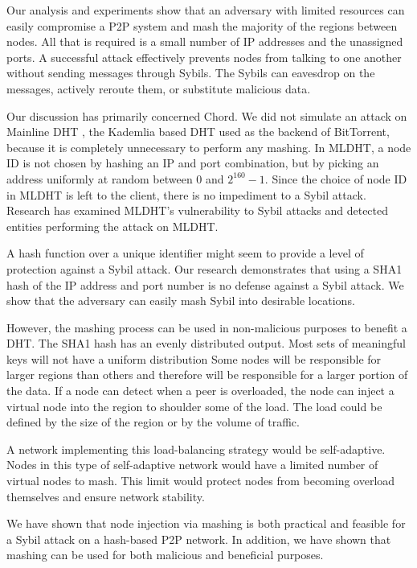 \documentclass[11pt,conference]{IEEEtran}
\begin{document}
Our analysis and experiments show that an adversary with limited resources can easily compromise a P2P system and mash the majority of the regions between nodes.
All that is required is a small number of IP addresses and the unassigned ports.
A successful attack effectively prevents nodes from talking to one another without sending messages through Sybils.
The Sybils can eavesdrop on the messages, actively reroute them, or substitute malicious data.

Our discussion has primarily concerned Chord.
We did not simulate an attack on Mainline DHT  \cite{mainline}, the Kademlia \cite{kademlia} based DHT used as the backend of BitTorrent, because it is completely unnecessary to perform any mashing.
In MLDHT, a node ID is not chosen by hashing an IP and port combination, but by picking an address uniformly at random between 0 and $2^{160}-1$.
Since the choice of node ID in MLDHT is left to the client, there is no impediment to a Sybil attack. 
Research has examined MLDHT's vulnerability to Sybil attacks \cite{sybilbit} and detected entities performing the attack on MLDHT.

A hash function over a unique identifier might seem to provide a level of protection against a Sybil attack.
Our research demonstrates that using a SHA1 hash of the IP address and port number is no defense against a Sybil attack. 
We show that the adversary can easily mash Sybil into desirable locations.


However, the mashing process can be used in non-malicious purposes to benefit a DHT.
The SHA1 hash has an evenly distributed output. 
Most sets of meaningful keys will not have a uniform distribution \cite{shannon2001mathematical}
Some nodes will be responsible for larger regions than others and therefore will be responsible for a larger portion of the data.
If a node can detect when a peer is overloaded, the node can inject a virtual node into the region to shoulder some of the load.
The load could be defined by the size of the region or by the volume of traffic.

A network implementing this load-balancing strategy would be self-adaptive.
Nodes in this type of self-adaptive network would have a limited number of virtual nodes to mash.
This limit would protect nodes from becoming overload themselves and ensure network stability.

We have shown that node injection via mashing is both practical and feasible for a Sybil attack on a hash-based P2P network.
In addition, we have shown that mashing can be used for both malicious and beneficial purposes.




\end{document}
